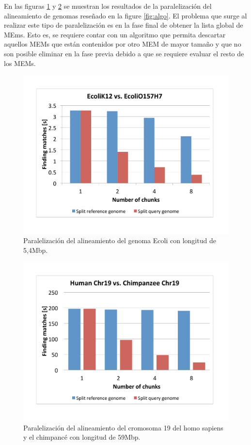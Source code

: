 \documentclass[12pt,a4paper]{article}
\begin{document}
\indent
En las figuras \ref{fig:ecoli} y \ref{fig:hspan} se muestran los resultados de la paralelización del alineamiento de genomas reseñado en la figure \ref{fig:algo}. El problema que surge al realizar este tipo de paralelización es en la fase final de obtener la lista global de MEms. Esto es, se requiere contar con un algoritmo que permita descartar aquellos MEMs que están contenidos por otro MEM de mayor tamaño y que no son posible eliminar en la fase previa debido a que se requiere evaluar el resto de los MEMs.\\
   \begin{figure}[h] 
   \centering 
   \includegraphics[scale=0.4]{ecoli2012.pdf} 
   \caption{Paralelización del alineamiento del genoma Ecoli con longitud de 5,4Mbp.} 
   \label{fig:ecoli} 
 \end{figure}
   \begin{figure}[h] 
   \centering 
   \includegraphics[scale=0.4]{hspan.pdf} 
   \caption{Paralelización del alineamiento del cromosoma 19 del homo sapiens y el chimpanc\'e con longitud de 59Mbp.} 
   \label{fig:hspan} 
 \end{figure}
\end{document}
